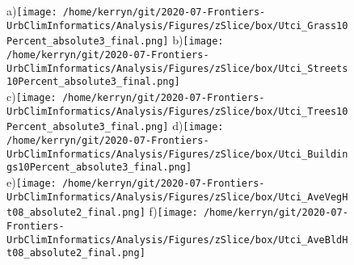 \documentclass{article}
\begin{document}
\begin{figure}           %
\centering    
{\tiny a)}\texttt{[image: /home/kerryn/git/2020-07-Frontiers-UrbClimInformatics/Analysis/Figures/zSlice/box/Utci\_Grass10Percent\_absolute3\_final.png]}
{\tiny b)}\texttt{[image: /home/kerryn/git/2020-07-Frontiers-UrbClimInformatics/Analysis/Figures/zSlice/box/Utci\_Streets10Percent\_absolute3\_final.png]}\\
{\tiny c)}\texttt{[image: /home/kerryn/git/2020-07-Frontiers-UrbClimInformatics/Analysis/Figures/zSlice/box/Utci\_Trees10Percent\_absolute3\_final.png]}
{\tiny d)}\texttt{[image: /home/kerryn/git/2020-07-Frontiers-UrbClimInformatics/Analysis/Figures/zSlice/box/Utci\_Buildings10Percent\_absolute3\_final.png]}\\
{\tiny e)}\texttt{[image: /home/kerryn/git/2020-07-Frontiers-UrbClimInformatics/Analysis/Figures/zSlice/box/Utci\_AveVegHt08\_absolute2\_final.png]}
{\tiny f)}\texttt{[image: /home/kerryn/git/2020-07-Frontiers-UrbClimInformatics/Analysis/Figures/zSlice/box/Utci\_AveBldHt08\_absolute2\_final.png]}
\end{figure} 
\clearpage

















\begin{figure}           %
\centering    
{}
\end{figure} 
\clearpage












\begin{figure}           %
\centering    
{}
\end{figure} 
\clearpage
\end{document}
